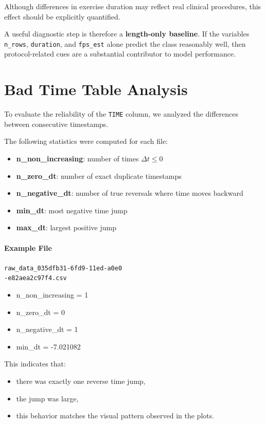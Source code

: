 \documentclass[11pt,twocolumn]{article}
\begin{document}
Although differences in exercise duration may reflect real clinical procedures, this effect should be explicitly quantified.

A useful diagnostic step is therefore a \textbf{length-only baseline}. If the variables \texttt{n\_rows}, \texttt{duration}, and \texttt{fps\_est} alone predict the class reasonably well, then protocol-related cues are a substantial contributor to model performance.
\section{Bad Time Table Analysis}

To evaluate the reliability of the \texttt{TIME} column, we analyzed the differences between consecutive timestamps.

The following statistics were computed for each file:

\begin{itemize}
\item \textbf{n\_non\_increasing}: number of times $\Delta t \le 0$
\item \textbf{n\_zero\_dt}: number of exact duplicate timestamps
\item \textbf{n\_negative\_dt}: number of true reversals where time moves backward
\item \textbf{min\_dt}: most negative time jump
\item \textbf{max\_dt}: largest positive jump
\end{itemize}
\paragraph{Example File}

\texttt{raw\_data\_035dfb31-6fd9-11ed-a0e0\\-e82aea2c97f4.csv}

\begin{itemize}
\item n\_non\_increasing = 1
\item n\_zero\_dt = 0
\item n\_negative\_dt = 1
\item min\_dt = -7.021082
\end{itemize}

This indicates that:

\begin{itemize}
\item there was exactly one reverse time jump,
\item the jump was large,
\item this behavior matches the visual pattern observed in the plots.
\end{itemize}
\end{document}
